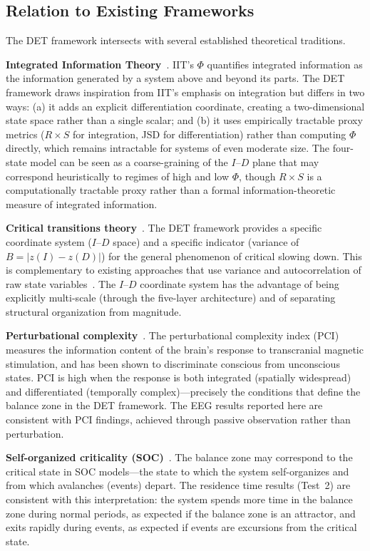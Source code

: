 \documentclass[aip,cha,reprint,amsmath,amssymb,final,floatfix]{revtex4-2}
\begin{document}
\subsection{Relation to Existing Frameworks}

The DET framework intersects with several established theoretical traditions.

\textbf{Integrated Information Theory}~\cite{tononi2016}. IIT's $\Phi$ quantifies integrated information as the information generated by a system above and beyond its parts. The DET framework draws inspiration from IIT's emphasis on integration but differs in two ways: (a) it adds an explicit differentiation coordinate, creating a two-dimensional state space rather than a single scalar; and (b) it uses empirically tractable proxy metrics ($R \times S$ for integration, JSD for differentiation) rather than computing $\Phi$ directly, which remains intractable for systems of even moderate size. The four-state model can be seen as a coarse-graining of the $I$--$D$ plane that may correspond heuristically to regimes of high and low $\Phi$, though $R \times S$ is a computationally tractable proxy rather than a formal information-theoretic measure of integrated information.

\textbf{Critical transitions theory}~\cite{scheffer2009,strogatz2015}. The DET framework provides a specific coordinate system ($I$--$D$ space) and a specific indicator (variance of $B = |z(I) - z(D)|$) for the general phenomenon of critical slowing down. This is complementary to existing approaches that use variance and autocorrelation of raw state variables~\cite{dakos2012}. The $I$--$D$ coordinate system has the advantage of being explicitly multi-scale (through the five-layer architecture) and of separating structural organization from magnitude.

\textbf{Perturbational complexity}~\cite{casali2013,sarasso2015}. The perturbational complexity index (PCI) measures the information content of the brain's response to transcranial magnetic stimulation, and has been shown to discriminate conscious from unconscious states. PCI is high when the response is both integrated (spatially widespread) and differentiated (temporally complex)---precisely the conditions that define the balance zone in the DET framework. The EEG results reported here are consistent with PCI findings, achieved through passive observation rather than perturbation.

\textbf{Self-organized criticality (SOC)}~\cite{bak1987,olami1992,strogatz2015}. The balance zone may correspond to the critical state in SOC models---the state to which the system self-organizes and from which avalanches (events) depart. The residence time results (Test~2) are consistent with this interpretation: the system spends more time in the balance zone during normal periods, as expected if the balance zone is an attractor, and exits rapidly during events, as expected if events are excursions from the critical state.
\end{document}
